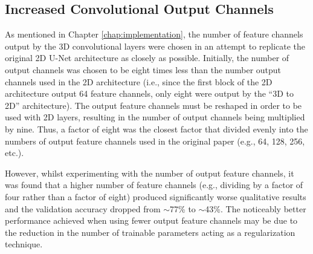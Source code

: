 \subsection{Increased Convolutional Output Channels}

As mentioned in Chapter \ref{chap:implementation}, the number of feature channels output by the 3D convolutional layers were chosen in an attempt to replicate the original 2D U-Net architecture as closely as possible. Initially, the number of output channels was chosen to be eight times less than the number output channels used in the 2D architecture (i.e., since the first block of the 2D architecture output 64 feature channels, only eight were output by the ``3D to 2D'' architecture). The output feature channels must be reshaped in order to be used with 2D layers, resulting in the number of output channels being multiplied by nine. Thus, a factor of eight was the closest factor that divided evenly into the numbers of output feature channels used in the original paper (e.g., 64, 128, 256, etc.).

However, whilst experimenting with the number of output feature channels, it was found that a higher number of feature channels (e.g., dividing by a factor of four rather than a factor of eight) produced significantly worse qualitative results and the validation accuracy dropped from ${\sim}$77\% to ${\sim}$43\%. The noticeably better performance achieved when using fewer output feature channels may be due to the reduction in the number of trainable parameters acting as a regularization technique.





